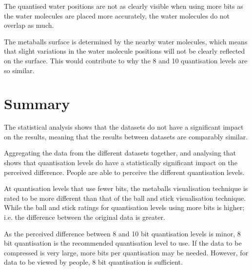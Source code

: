 The quantised water positions are not as clearly visible when using more bits
as the water molecules are placed more accurately, the water molecules do not
overlap as much.

The metaballs surface is determined by the nearby water molecules, which means
that slight variations in the water molecule positions will not be clearly
reflected on the surface. This would contribute to why the 8 and 10
quantisation levels are so similar.



\section{Summary}
\label{sec:experiment_summary}

The statistical analysis shows that the datasets do not have a significant
impact on the results, meaning that the results between datasets are comparably
similar.

Aggregating the data from the different datasets together, and analysing that
shows that quantisation levels do have a statistically significant impact on
the perceived difference. People are able to perceive the different
quantisation levels.

At quantisation levels that use fewer bits, the metaballs visualisation
technique is rated to be more different than that of the ball and stick
visualisation technique. While the ball and stick ratings for quantisation
levels using more bits is higher; i.e. the difference between the original data
is greater.

As the perceived difference between 8 and 10 bit quantisation levels is minor,
8 bit quantisation is the recommended quantisation level to use. If the data to
be compressed is very large, more bits per quantisation may be needed. However,
for data to be viewed by people, 8 bit quantisation is sufficient.




